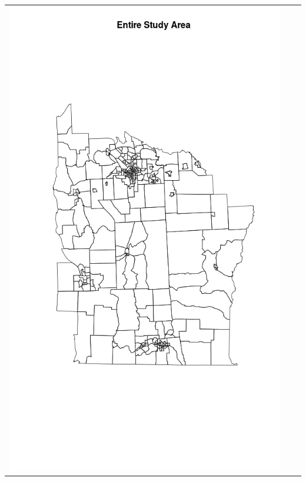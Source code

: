 \documentclass[12pt]{article}
\begin{document}
		\begin{tabular}{|c|c|c|}
			
		\hline
			\includegraphics[scale=0.2]{nyplot.png}

\end{tabular}
\end{document}
